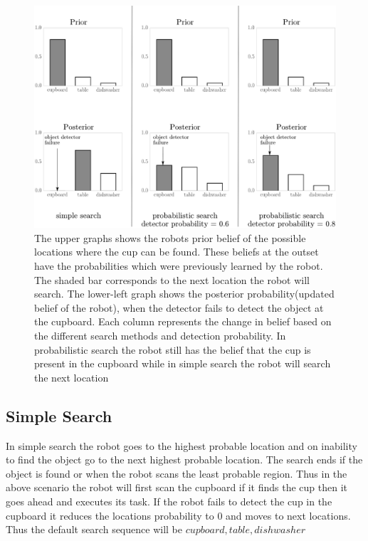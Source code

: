 \begin{figure}[htp]
\centering
\includegraphics[width=\textwidth]{images/search.png}
\caption[Probabilistic search scenario]{The upper graphs shows the robots prior belief of the possible locations where the cup can be found. These beliefs at the outset have the probabilities which were previously learned by the robot. The shaded bar corresponds to the next location the robot will search. The lower-left graph shows the posterior probability(updated belief of the robot), when the detector fails to detect the object at the cupboard. Each column represents the change in belief based on the different search methods and detection probability. In probabilistic search the robot still has the belief that the cup is present in the cupboard while in simple search the robot will search the next location}

\label{fig:search_results}
\end{figure}

 
\subsection{Simple Search}

In simple search the robot goes to the highest probable location and on inability to find the object go to the next highest probable location. The search ends if the object is found or when the robot scans the least probable region. Thus in the above scenario the robot will first scan the cupboard if it finds the cup then it goes ahead and executes its task. If the robot fails to detect the cup in the cupboard it reduces the locations probability to $0$ and moves to next locations. Thus the default search sequence will be ${cupboard, table, dishwasher}$

